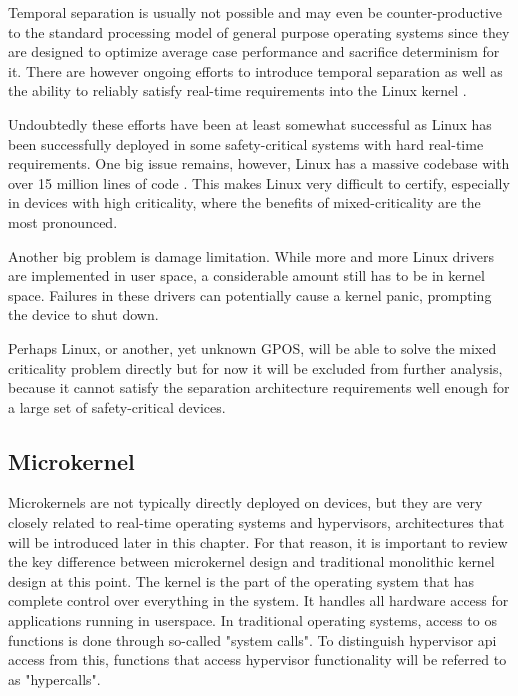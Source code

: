 Temporal separation is usually not possible and may even be counter-productive to the standard processing model of general purpose operating systems since they are designed to optimize average case performance and sacrifice determinism for it. There are however ongoing efforts to introduce temporal separation as well as the ability to reliably satisfy real-time requirements into the Linux kernel \cite{arthur2007assessment}.

Undoubtedly these efforts have been at least somewhat successful as Linux has been successfully deployed in some safety-critical systems with hard real-time requirements. One big issue remains, however, Linux has a massive codebase with over 15 million lines of code \cite{paul2012linux}. This makes Linux very difficult to certify, especially in devices with high criticality, where the benefits of mixed-criticality are the most pronounced.

Another big problem is damage limitation. While more and more Linux drivers are implemented in user space, a considerable amount still has to be in kernel space. Failures in these drivers can potentially cause a kernel panic, prompting the device to shut down. 

Perhaps Linux, or another, yet unknown GPOS, will be able to solve the mixed criticality problem directly but for now it will be excluded from further analysis, because it cannot satisfy the separation architecture requirements well enough for a large set of safety-critical devices.
\subsection{Microkernel} \label{microkernel}
Microkernels are not typically directly deployed on devices, but they are very closely related to real-time operating systems and hypervisors, architectures that will be introduced later in this chapter. For that reason, it is important to review the key difference between microkernel design and traditional monolithic kernel design at this point.
The kernel is the part of the operating system that has complete control over everything in the system. It handles all hardware access for applications running in userspace. In traditional operating systems, access to \acrshort{os} functions is done through so-called "system calls". To distinguish hypervisor \acrshort{api} access from this, functions that access hypervisor functionality will be referred to as "hypercalls".
